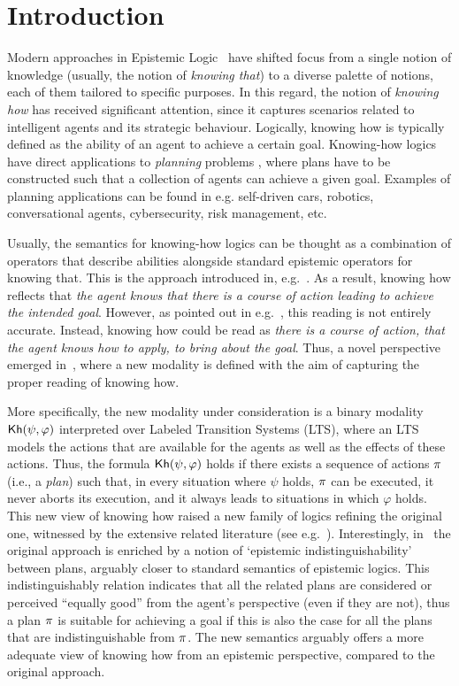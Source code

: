 \section{Introduction}
\label{sec:intro}

Modern approaches in Epistemic Logic~\cite{vonWright:1951,Hintikka:1962} have shifted focus from a single notion of knowledge (usually, the notion of \emph{knowing that}) to a diverse palette of notions, each of them tailored to specific purposes. In this regard, the notion of \emph{knowing how} has received significant attention, since it captures scenarios related to intelligent agents and its strategic behaviour. Logically, knowing how is typically defined as the ability of an agent to achieve a certain goal.  Knowing-how logics have direct applications to \emph{planning} problems \cite{Stuart21},  where  plans have to be constructed such that a collection of agents can achieve a given goal.  Examples of planning applications can be found in e.g. self-driven cars,  robotics,  conversational agents,  cybersecurity,  risk management,  etc.

Usually,  the semantics for knowing-how logics can be thought as a combination of operators that describe abilities alongside standard epistemic operators for knowing that.  This is the approach introduced in, e.g.~\cite{Mccarthy69,Moore85,Les00,Hoek00,HerzigT06}. As a result,  knowing how reflects that \emph{the agent knows that there is a course of action leading to achieve the intended goal}. However,  as pointed out in e.g.~\cite{JamrogaA07,Herzig15}, this reading is not entirely accurate.  Instead, knowing how could be read as \emph{there is a course of action, that the agent knows how to apply, to bring about the goal}. Thus, a novel perspective emerged in~\cite{Wang15lori,Wang16,Wang2016}, where a new modality is defined with the aim of capturing the proper reading of knowing how. 

More specifically, the new modality under consideration is a binary modality ${\mathsf{Kh}}(\psi,\varphi)$ interpreted over Labeled Transition Systems (LTS), where an LTS models the  actions that are available for the agents as well as the effects of these actions. Thus,  the formula ${\mathsf{Kh}}(\psi,\varphi)$ holds if there exists a sequence of actions $\pi$ (i.e., a \emph{plan}) such that,  in every situation where $\psi$ holds, $\pi$ can be executed, it never aborts its execution, and it always leads to situations in which $\varphi$ holds. This new view of knowing how raised a new family of logics refining the original one, witnessed by the extensive related literature (see e.g.~\cite{LiWang17,Li17,FervariHLW17,NaumovT19,Naumov2018a}). Interestingly, in~\cite{AFSVQ21,AFSVQ23} the original approach is enriched by a notion of `epistemic indistinguishability' between plans, arguably closer to standard semantics of epistemic logics. This indistinguishably relation indicates that all the related plans are considered or perceived ``equally good''
from the agent's perspective (even if they are not), thus a plan $\pi$ is suitable for achieving a goal if this is also the case for all the plans that are indistinguishable from $\pi$. The new semantics arguably offers a more adequate view of knowing how from an epistemic perspective, compared to the original approach.


